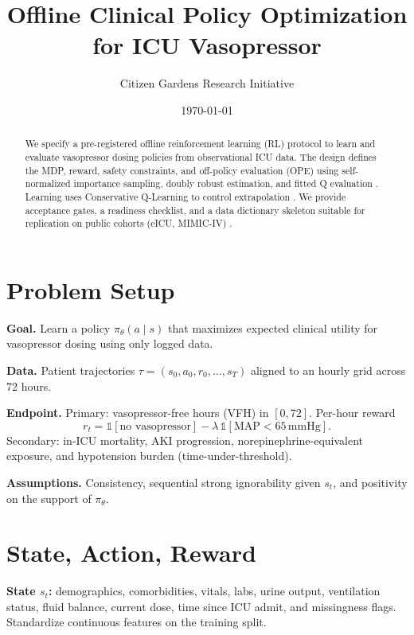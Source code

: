 \documentclass[11pt]{article}
\title{Offline Clinical Policy Optimization for ICU Vasopressor}
\author{Citizen Gardens Research Initiative}
\date{\today}
\begin{document}
\maketitle

\begin{abstract}
We specify a pre-registered offline reinforcement learning (RL) protocol to learn and evaluate vasopressor dosing policies from observational ICU data. The design defines the MDP, reward, safety constraints, and off-policy evaluation (OPE) using self-normalized importance sampling, doubly robust estimation, and fitted Q evaluation \citep{swaminathan2015crm,jiang2016doubly,le2019fqe}. Learning uses Conservative Q-Learning to control extrapolation \citep{kumar2020conservative}. We provide acceptance gates, a readiness checklist, and a data dictionary skeleton suitable for replication on public cohorts (eICU, MIMIC-IV) \citep{pollard2018eicu,johnson2023mimiciv}.
\end{abstract}

\section{Problem Setup}
\textbf{Goal.} Learn a policy $\pi_\theta(a\mid s)$ that maximizes expected clinical utility for vasopressor dosing using only logged data.

\textbf{Data.} Patient trajectories $\tau=(s_0,a_0,r_0,\ldots,s_T)$ aligned to an hourly grid across 72 hours.

\textbf{Endpoint.} Primary: vasopressor-free hours (VFH) in $[0,72]$. Per-hour reward
\begin{equation}
 r_t=\mathbb{1}[\text{no vasopressor}] - \lambda\,\mathbb{1}[\mathrm{MAP}<65\,\mathrm{mmHg}].
\end{equation}
Secondary: in-ICU mortality, AKI progression, norepinephrine-equivalent exposure, and hypotension burden (time-under-threshold).

\textbf{Assumptions.} Consistency, sequential strong ignorability given $s_t$, and positivity on the support of $\pi_\theta$.

\section{State, Action, Reward}
\textbf{State $s_t$:} demographics, comorbidities, vitals, labs, urine output, ventilation status, fluid balance, current dose, time since ICU admit, and missingness flags. Standardize continuous features on the training split.
\end{document}
